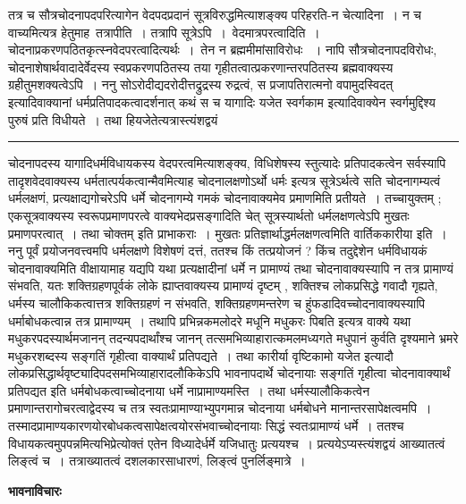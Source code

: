 \documentclass[11pt, openany]{book}
\begin{document}
 तत्र च सौत्रचोदनापदपरित्यागेन वेदपदप्रदानं सूत्रविरुद्धमित्याशङ्क्य परिहरति-{\br न चेत्यादिना~।} न च वाच्यमित्यत्र हेतुमाह\textendash\ {\br तत्रापीति~।}
तत्रापि सूत्रेऽपि~।~{\br वेदमात्रपरत्वादिति~।} चोदनाप्रकरणपठितकृत्स्नवेदपरत्वादित्यर्थः~।~तेन न ब्रह्ममीमांसाविरोधः ~। नापि सौत्रचोदनापदविरोधः, चोदनाशेषार्थवादादेर्वेदस्य स्वप्रकरणपठितस्य तया गृहीतत्वात्प्रकरणान्तरपठितस्य ब्रह्मवाक्यस्य ग्रहीतुमशक्यत्वेऽपि~।  ननु {\qt सोऽरोदीद्यदरोदीत्तद्रुद्रस्य रुद्रत्वं, स प्रजापतिरात्मनो वपामुदस्विदत्} इत्यादिवाक्यानां धर्मप्रतिपादकत्वादर्शनात् कथं 
\newpage
\fancyhead[LO]{प्रतिपादकत्वम् ]}
{\bl 
स च यागादिः {\al यजेत स्वर्गकाम} इत्यादिवाक्येन स्वर्गमुद्दिश्य पुरुषं प्रति विधीयते~। तथा हि\textendash यजेतेत्यत्रास्त्यंशद्वयं}\\
\hrule
\vspace{3mm}

\noindent चोदनापदस्य यागादिधर्मविधायकस्य वेदपरत्वमित्याशङ्क्य, विधिशेषस्य स्तुत्यादेः प्रतिपादकत्वेन सर्वस्यापि तादृशवेदवाक्यस्य धर्मतात्पर्यकत्वान्मैवमित्याह  {\qt चोदनालक्षणोऽर्थो धर्मः} इत्यत्र सूत्रेऽर्थत्वे सति चोदनागम्यत्वं धर्मलक्षणं, प्रत्यक्षाद्यगोचरेऽपि धर्मे चोदनागम्ये गमकं चोदनावाक्यमेव प्रमाणमिति प्रतीयते~। तच्चायुक्तम् ; एकसूत्रवाक्यस्य स्वरूपप्रमाणपरत्वे वाक्यभेदप्रसङ्गादिति चेत् सूत्रस्यार्थतो धर्मलक्षणत्वेऽपि मुखतः प्रमाणपरत्वात्~। तथा चोक्तम् इति प्राभाकराः~। {\qt मुखतः प्रतिज्ञार्थाद्धर्मलक्षणत्वमिति वार्तिककारीया} इति~।\\

 {\br ननु} पूर्वं प्रयोजनवत्त्वमपि धर्मलक्षणे विशेषणं दत्तं, ततश्च किं तत्प्रयोजनं ? किंच तदुद्देशेन धर्मविधायकं चोदनावाक्यमिति वीक्षायामाह यद्यपि यथा प्रत्यक्षादीनां धर्मे न प्रामाण्यं तथा चोदनावाक्यस्यापि न तत्र प्रामाण्यं संभवति, यतः शक्तिग्रहणपूर्वकं लोके ह्याप्तवाक्यस्य प्रामाण्यं दृष्टम् , शक्तिश्च लोकप्रसिद्धे गवादौ गृह्यते, धर्मस्य चालौकिकत्वात्तत्र शक्तिग्रहणं न संभवति, शक्तिग्रहणमन्तरेण च हुंफडादिवच्चोदनावाक्यस्यापि धर्माबोधकत्वान्न तत्र प्रामाण्यम्~। तथापि {\qt प्रभिन्नकमलोदरे मधूनि मधुकरः पिबति} इत्यत्र वाक्ये यथा मधुकरपदस्यार्थमजानन् तदन्यपदार्थांश्च जानन् तत्समभिव्याहारात्कमलमध्यगते मधुपानं कुर्वति दृश्यमाने भ्रमरे मधुकरशब्दस्य सङ्गतिं गृहीत्वा वाक्यार्थं प्रतिपद्यते~। तथा {\qt कारीर्या वृष्टिकामो यजेत} इत्यादौ लोकप्रसिद्धार्थवृष्ट्यादिपदसमभिव्याहारादलौकिकेऽपि भावनापदार्थे चोदनायाः सङ्गतिं गृहीत्वा चोदनावाक्यार्थं प्रतिपद्यत इति धर्मबोधकत्वाच्चोदनाया धर्मे नाप्रामाण्यमस्ति~। तथा धर्मस्यालौकिकत्वेन प्रमाणान्तरागोचरत्वाद्वेदस्य च तत्र स्वतःप्रामाण्याभ्युपगमान्न चोदनाया धर्मबोधने मानान्तरसापेक्षत्वमपि~। तस्मादप्रामाण्यकारणयोरबोधकत्वसापेक्षत्वयोरसंभवाच्चोदनायाः सिद्धं स्वतःप्रामाण्यं धर्मे~। ततश्च
विधायकत्वमुपपन्नमित्यभिप्रेत्योक्तं एतेन विध्यादेर्धर्मे
\newpage
\fancyhead[RE]{[ भावनाविचारः ]}
{\bl \noindent  यजिधातुः प्रत्ययश्च~। प्रत्ययेऽप्यस्त्यंशद्वयं आख्यातत्वं लिङ्त्वं च~। तत्राख्यातत्वं दशलकारसाधारणं, लिङ्त्वं पुनर्लिङ्मात्रे~।~}
\begin{center}
 \textbf{भावनाविचारः}
\end{center}
 
\end{document}

